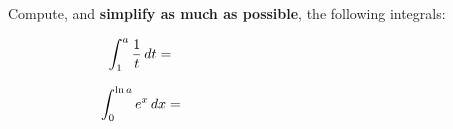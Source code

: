 Compute, and \textbf{simplify as much as possible}, the following integrals:

$$\int_1^a \frac{1}{t}\,dt = \hspace{60mm}$$

\vspace{40mm}

$$\int_0^{\ln a} e^x\,dx = \hspace{60mm}$$
